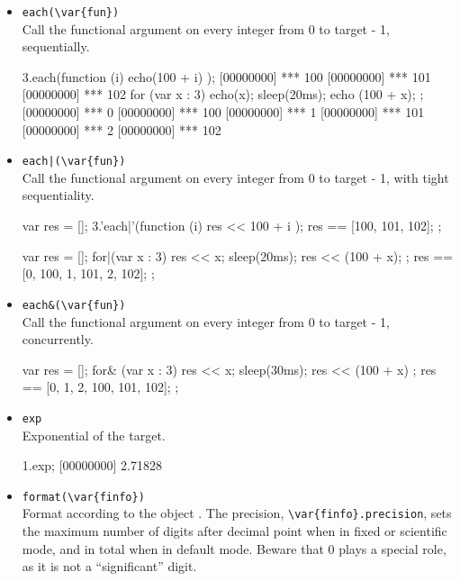 \begin{itemize}
\item \lstinline|each(\var{fun})|\\
  Call the functional argument  on every integer from 0 to
  target - 1, sequentially.
\begin{urbiscript}[firstnumber=last]
3.each(function (i) { echo(100 + i) });
[00000000] *** 100
[00000000] *** 101
[00000000] *** 102
for (var x : 3) { echo(x); sleep(20ms); echo (100 + x); };
[00000000] *** 0
[00000000] *** 100
[00000000] *** 1
[00000000] *** 101
[00000000] *** 2
[00000000] *** 102
\end{urbiscript}

\item \lstinline'each|(\var{fun})'\\
  Call the functional argument  on every integer from 0 to
  target - 1, with tight sequentiality.
\begin{urbiassert}[firstnumber=last]
{
  var res = [];
  3.'each|'(function (i) { res << 100 + i });
  res == [100, 101, 102];
};

{
  var res = [];
  for|(var x : 3) { res << x; sleep(20ms); res << (100 + x); };
  res == [0, 100, 1, 101, 2, 102];
};
\end{urbiassert}%

\item \lstinline|each&(\var{fun})|\\
  Call the functional argument  on every integer from 0 to
  target - 1, concurrently.
\begin{urbiassert}[firstnumber=last]
{
  var res = [];
  for& (var x : 3) { res << x; sleep(30ms); res << (100 + x) };
  res == [0, 1, 2, 100, 101, 102];
};
\end{urbiassert}%

\item \lstinline|exp|\\
  Exponential of the target.
\begin{urbiscript}[firstnumber=last]
1.exp;
[00000000] 2.71828
\end{urbiscript}

\item \lstinline|format(\var{finfo})|\\
  Format according to the  object .
  The precision, \lstinline|\var{finfo}.precision|, sets the maximum
  number of digits after decimal point when in fixed or scientific
  mode, and in total when in default mode.  Beware that 0 plays a
  special role, as it is not a ``significant'' digit.


\end{itemize}
